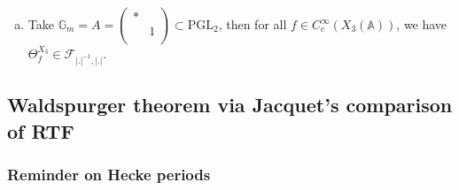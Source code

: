 \documentclass[reqno]{amsart} 
\numberwithin{theorem}{section}
\numberwithin{equation}{section}
\numberwithin{exercise}{section}
\begin{document}
\begin{example}
\begin{enumerate}[(a)]
  \item\label{enumerate:cq6tht7mp9} Take $\mathbb{G}_m = A = \left(
      \begin{smallmatrix}
        \ast&\\
                                &1 \\
      \end{smallmatrix}
    \right) \subset \mathrm{PGL}_2$, then for all $f \in C_c^\infty(X_3(\mathbb{A}))$, we have $\Theta_f^{X_3} \in \mathcal{F}_{\lvert . \rvert^{-1}, \lvert . \rvert}$.
  \end{enumerate}
\end{example}

\subsection{Waldspurger theorem via Jacquet's comparison of RTF}

\subsubsection{Reminder on Hecke periods}
\end{document}
